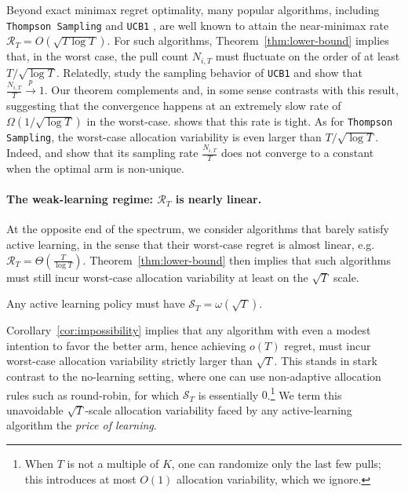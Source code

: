 \documentclass[nonblindrev]{informs3_noinforms}
\begin{document}
{Beyond exact minimax regret optimality, many popular algorithms, including \texttt{Thompson Sampling} \citep{agrawal2012analysis} and \texttt{UCB1} \citep{auer2002finite}, are well known to attain the near-minimax rate $\mathcal{R}_T = O(\sqrt{T\log T})$. For such algorithms, Theorem~\ref{thm:lower-bound} implies that, in the worst case, the pull count $N_{i,T}$ must fluctuate on the order of at least $T/\sqrt{\log T}$.  Relatedly, \citep{kalvit2021closer} study the sampling behavior of \texttt{UCB1} and show that $\frac{N_{i,T}}{T} \xrightarrow{p} 1$. Our theorem complements and, in some sense contrasts with this result, suggesting that the convergence happens at an extremely slow rate of $\Omega(1/\sqrt{\log T})$ in the worst-case. \citet{chen2025characterization} shows that this rate is tight. As for \texttt{Thompson Sampling}, the worst-case allocation variability is even larger than $T/\sqrt{\log T}$. Indeed, \cite{kalvit2021closer} and \cite{han2026thompson} show that its sampling rate $\frac{N_{i,T}}{T}$ does not converge to a constant when the optimal arm is non-unique. 

\paragraph{The weak-learning regime: $\mathcal{R}_T$ is nearly linear.} At the opposite end of the spectrum, we consider algorithms that barely satisfy active learning, in the sense that their worst-case regret is almost linear, e.g. $\mathcal{R}_T = \Theta(\frac{T}{\log T}).$ Theorem~\ref{thm:lower-bound} then implies that such algorithms must still incur worst-case allocation variability at least on the $\sqrt{T}$ scale. 
\begin{corollary}\label{cor:impossibility}
Any active learning policy must have  $\mathcal{S}_T = \omega(\sqrt{T})$.
\end{corollary}
Corollary~\ref{cor:impossibility} implies that any algorithm with even a modest intention to favor the better arm, hence achieving $o(T)$ regret, must incur worst-case allocation variability strictly larger than $\sqrt{T}$. This stands in stark contrast to the no-learning setting, where one can use non-adaptive allocation rules such as round-robin, for which $\mathcal{S}_T$ is essentially $0$.\footnote{When $T$ is not a multiple of $K$, one can randomize only the last few pulls; this introduces at most $O(1)$ allocation variability, which we ignore.} We term this unavoidable $\sqrt{T}$-scale allocation variability faced by any active-learning algorithm the \emph{price of learning}. 

}
\end{document}
